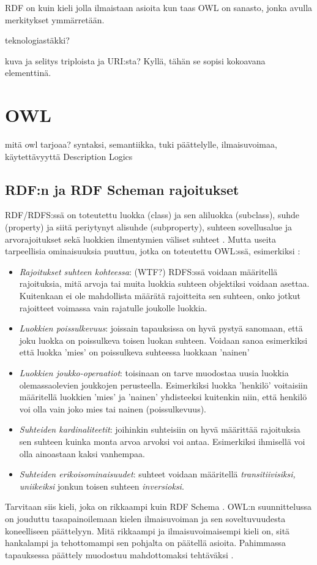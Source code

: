 \documentclass[a4paper,10pt]{article}
\begin{document}
RDF on kuin kieli jolla ilmaistaan asioita kun taas OWL on sanasto, jonka avulla merkitykset ymmärretään. 

teknologiastäkki?

kuva ja selitys triploista ja URI:sta? Kyllä, tähän se sopisi kokoavana elementtinä.


\section{OWL}

mitä owl tarjoaa? syntaksi, semantiikka, tuki päättelylle, ilmaisuvoimaa, käytettävyyttä
Description Logics
\subsection{RDF:n ja RDF Scheman rajoitukset}
RDF/RDFS:ssä on toteutettu luokka (class) ja sen aliluokka (subclass), suhde (property) ja siitä periytynyt alisuhde (subproperty), suhteen sovellusalue ja arvorajoitukset sekä luokkien ilmentymien väliset suhteet \cite{AH09}. Mutta useita tarpeellisia ominaisuuksia puuttuu, jotka on toteutettu OWL:ssä, esimerkiksi \cite{AH09}:
\begin{itemize}
 \item \textit{Rajoitukset suhteen kohteessa}: (WTF?) RDFS:ssä voidaan määritellä rajoituksia, mitä arvoja tai muita luokkia suhteen objektiksi voidaan asettaa. Kuitenkaan ei ole mahdollista määrätä rajoitteita sen suhteen, onko jotkut rajoitteet voimassa vain rajatulle joukolle luokkia. 
 \item \textit{Luokkien poissulkevuus}: joissain tapauksissa on hyvä pystyä sanomaan, että joku luokka on poissulkeva toisen luokan suhteen. Voidaan sanoa esimerkiksi että luokka 'mies' on poissulkeva suhteessa luokkaan 'nainen'
 \item \textit{Luokkien joukko-operaatiot}: toisinaan on tarve muodostaa uusia luokkia olemassaolevien joukkojen perusteella. Esimerkiksi luokka 'henkilö' voitaisiin määritellä luokkien 'mies' ja 'nainen' yhdisteeksi kuitenkin niin, että henkilö voi olla vain joko mies tai nainen (poissulkevuus).
 \item \textit{Suhteiden kardinaliteetit}: joihinkin suhteisiin on hyvä määrittää rajoituksia sen suhteen kuinka monta arvoa arvoksi voi antaa. Esimerkiksi ihmisellä voi olla ainoastaan kaksi vanhempaa.
 \item \textit{Suhteiden erikoisominaisuudet}: suhteet voidaan määritellä \textit{transitiivisiksi, uniikeiksi} jonkun toisen suhteen \textit{inversioksi}. 
\end{itemize}
Tarvitaan siis kieli, joka on rikkaampi kuin RDF Schema \cite{AH09}. OWL:n suunnittelussa on jouduttu tasapainoilemaan kielen ilmaisuvoiman ja sen soveltuvuudesta koneelliseen päättelyyn. Mitä rikkaampi ja ilmaisuvoimaisempi kieli on, sitä hankalampi ja tehottomampi sen pohjalta on päätellä asioita. Pahimmassa tapauksessa päättely muodostuu mahdottomaksi tehtäväksi \cite{AH09}.   
\end{document}
